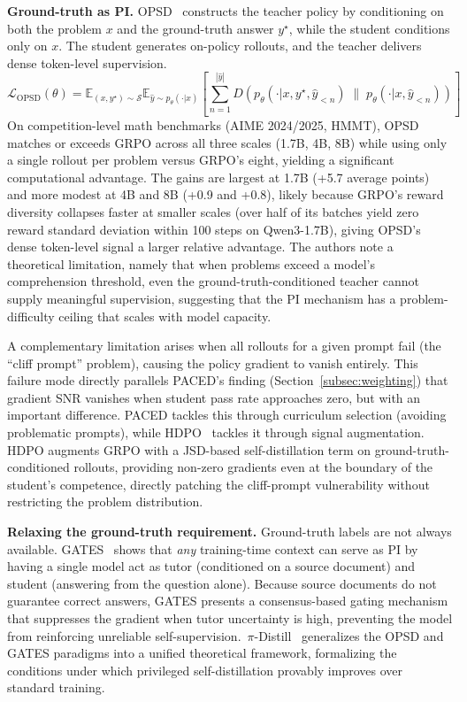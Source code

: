 \documentclass{article} %
\newcommand{\E}{\mathbb{E}}
\newcommand{\ptheta}{p_\theta}
\newcommand{\loss}{\mathcal{L}}
\begin{document}
\textbf{Ground-truth as PI.} OPSD~\citep{2601.18734} constructs the teacher policy by conditioning on both the problem $x$ and the ground-truth answer $y^\star$, while the student conditions only on $x$. The student generates on-policy rollouts, and the teacher delivers dense token-level supervision.
\begin{equation}
    \loss_{\text{OPSD}}(\theta) = \E_{(x, y^\star) \sim \mathcal{S}} \E_{\hat{y} \sim \ptheta(\cdot|x)} \left[ \sum_{n=1}^{|\hat{y}|} D\!\left( p_\theta(\cdot|x, y^\star, \hat{y}_{<n}) \;\|\; \ptheta(\cdot|x, \hat{y}_{<n}) \right) \right]
\end{equation}
On competition-level math benchmarks (AIME 2024/2025, HMMT), OPSD matches or exceeds GRPO across all three scales (1.7B, 4B, 8B) while using only a single rollout per problem versus GRPO's eight, yielding a significant computational advantage. The gains are largest at 1.7B (+5.7 average points) and more modest at 4B and 8B (+0.9 and +0.8), likely because GRPO's reward diversity collapses faster at smaller scales (over half of its batches yield zero reward standard deviation within 100 steps on Qwen3-1.7B), giving OPSD's dense token-level signal a larger relative advantage. The authors note a theoretical limitation, namely that when problems exceed a model's comprehension threshold, even the ground-truth-conditioned teacher cannot supply meaningful supervision, suggesting that the PI mechanism has a problem-difficulty ceiling that scales with model capacity.

A complementary limitation arises when all rollouts for a given prompt fail (the ``cliff prompt'' problem), causing the policy gradient to vanish entirely. This failure mode directly parallels PACED's finding (Section~\ref{subsec:weighting}) that gradient SNR vanishes when student pass rate approaches zero, but with an important difference. PACED tackles this through curriculum selection (avoiding problematic prompts), while HDPO~\citep{2603.23871} tackles it through signal augmentation. HDPO augments GRPO with a JSD-based self-distillation term on ground-truth-conditioned rollouts, providing non-zero gradients even at the boundary of the student's competence, directly patching the cliff-prompt vulnerability without restricting the problem distribution.

\textbf{Relaxing the ground-truth requirement.} Ground-truth labels are not always available. GATES~\citep{2602.20574} shows that \emph{any} training-time context can serve as PI by having a single model act as tutor (conditioned on a source document) and student (answering from the question alone). Because source documents do not guarantee correct answers, GATES presents a consensus-based gating mechanism that suppresses the gradient when tutor uncertainty is high, preventing the model from reinforcing unreliable self-supervision.~$\pi$-Distill~\citep{2602.04942} generalizes the OPSD and GATES paradigms into a unified theoretical framework, formalizing the conditions under which privileged self-distillation provably improves over standard training.
\end{document}
